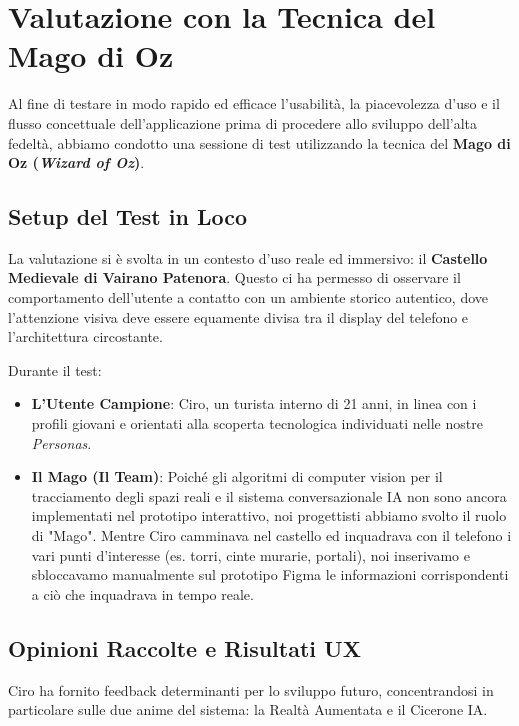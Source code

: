 \section{Valutazione con la Tecnica del Mago di Oz}

Al fine di testare in modo rapido ed efficace l'usabilità, la piacevolezza d'uso e il flusso concettuale dell'applicazione prima di procedere allo sviluppo dell'alta fedeltà, abbiamo condotto una sessione di test utilizzando la tecnica del \textbf{Mago di Oz (\textit{Wizard of Oz})}.

\subsection{Setup del Test in Loco}
La valutazione si è svolta in un contesto d'uso reale ed immersivo: il \textbf{Castello Medievale di Vairano Patenora}. Questo ci ha permesso di osservare il comportamento dell'utente a contatto con un ambiente storico autentico, dove l'attenzione visiva deve essere equamente divisa tra il display del telefono e l'architettura circostante.

Durante il test:
\begin{itemize}[leftmargin=1.5em]
    \item \textbf{L'Utente Campione}: Ciro, un turista interno di 21 anni, in linea con i profili giovani e orientati alla scoperta tecnologica individuati nelle nostre \textit{Personas}.
    \item \textbf{Il Mago (Il Team)}: Poiché gli algoritmi di computer vision per il tracciamento degli spazi reali e il sistema conversazionale IA non sono ancora implementati nel prototipo interattivo, noi progettisti abbiamo svolto il ruolo di "Mago". Mentre Ciro camminava nel castello ed inquadrava con il telefono i vari punti d'interesse (es. torri, cinte murarie, portali), noi inserivamo e sbloccavamo manualmente sul prototipo Figma le informazioni corrispondenti a ciò che inquadrava in tempo reale.
\end{itemize}

\subsection{Opinioni Raccolte e Risultati UX}
Ciro ha fornito feedback determinanti per lo sviluppo futuro, concentrandosi in particolare sulle due anime del sistema: la Realtà Aumentata e il Cicerone IA.

